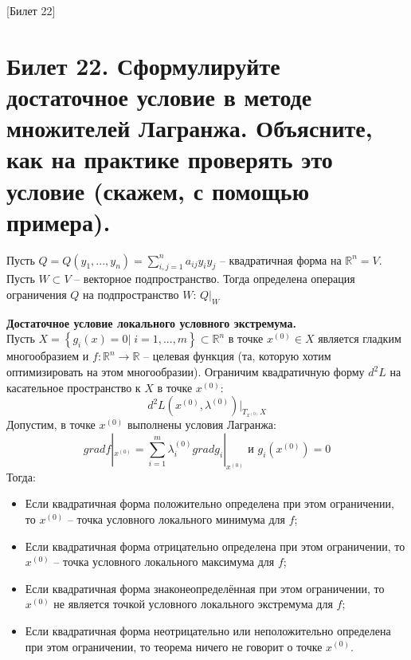 [Билет 22]

\section{Билет 22. Сформулируйте достаточное условие в методе множителей Лагранжа. Объясните, как на практике
проверять это условие (скажем, с помощью примера).}
\begin{remark}
    Пусть $Q = Q(y_1, ..., y_n) = \sum\limits_{i, j = 1}^n a_{ij} y_i y_j$ -- квадратичная форма
    на $\mathbb{R}^n = V$. Пусть $W \subset V$ -- векторное подпространство. Тогда определена операция ограничения $Q$
    на подпространство $W$: $Q|_W$
\end{remark}

\begin{theorem}{\textbf{Достаточное условие локального условного экстремума.}}\\
    Пусть $X = \left\{g_i(x) = 0 | \; i = 1,..., m\right\} \subset \mathbb{R}^n$ в точке $x^{(0)} \in X$ является гладким многообразием и
    $f: \mathbb{R}^n \to \mathbb{R}$ -- целевая функция (та, которую хотим оптимизировать на этом многообразии).
    Ограничим квадратичную форму $d^2 L$ на касательное пространство к $X$ в точке $x^{(0)}$:
    $$d^2 L(x^{(0)}, \lambda^{(0)})|_{T_{x^{(0)}}X}$$
    Допустим, в точке $x^{(0)}$ выполнены условия Лагранжа:
    $$gradf|_{x^{(0)}} = \sum\limits_{i = 1}^m \lambda^{(0)}_i gradg_i|_{x^{(0)}} \text{ и } g_{i}(x^{(0)}) = 0$$
    Тогда:
    \begin{itemize}
        \item Если квадратичная форма положительно определена при этом ограничении, то $x^{(0)}$ -- точка условного локального минимума для $f$;
        \item Если квадратичная форма отрицательно определена при этом ограничении, то $x^{(0)}$ -- точка условного локального максимума для $f$;
        \item Если квадратичная форма знаконеопределённая при этом ограничении, то $x^{(0)}$ не является точкой условного локального экстремума для $f$;
        \item Если квадратичная форма неотрицательно или неположительно определена при этом ограничении, то теорема ничего не говорит о точке $x^{(0)}$.
    \end{itemize}
\end{theorem}

